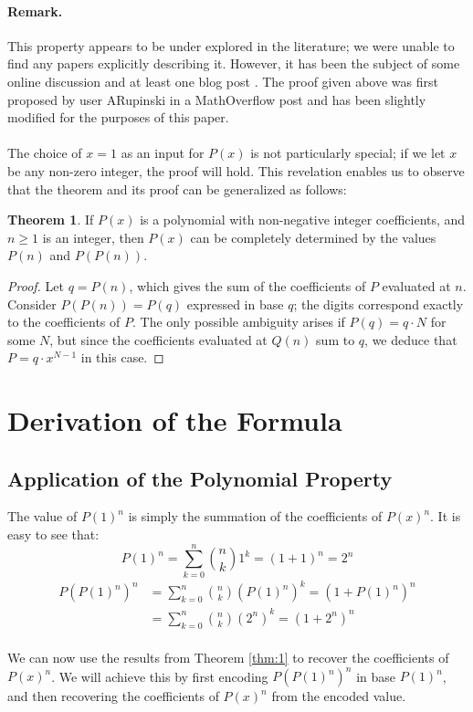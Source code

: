 \documentclass{article}
\theoremstyle{plain}
\theoremstyle{definition}
\newtheorem{thm}{Theorem}
\begin{document}
\paragraph{\textbf{Remark.}}
This property appears to be under explored in the literature; we were unable to find any papers explicitly describing it. However, it has been the subject of some online discussion and at least one blog post \cite{jcook}. The proof given above was first proposed by user ARupinski in a MathOverflow post \cite{arupinski} and has been slightly modified for the purposes of this paper.
\\
\\
The choice of $x=1$ as an input for $P(x)$ is not particularly special; if we let $x$ be any non-zero integer, the proof will hold. This revelation enables us to observe that the theorem and its proof can be generalized as follows:

\begin{thm}
\label{thm:2}
If $P(x)$ is a polynomial with non-negative integer coefficients, and $n \geq 1$ is an integer, then $P(x)$ can be completely determined by the values $P(n)$ and $P(P(n))$.
\end{thm}
\begin{proof}
Let $q = P(n)$, which gives the sum of the coefficients of $P$ evaluated at $n$. Consider $P(P(n)) = P(q)$ expressed in base $q$; the digits correspond exactly to the coefficients of $P$. The only possible ambiguity arises if $P(q) = q\cdot N$ for some $N$, but since the coefficients evaluated at $Q(n)$ sum to $q$, we deduce that $P = q \cdot x^{N-1}$ in this case.
\end{proof}

\section{Derivation of the Formula}

\subsection{Application of the Polynomial Property}
The value of $P(1)^{n}$ is simply the summation of the coefficients of $P(x)^{n}$. It is easy to see that:
\begin{equation}
P(1)^{n} = \sum_{k=0}^{n} \binom{n}{k} 1^{k} = (1 + 1)^{n} = 2^{n}
\end{equation}
\begin{align}
P(P(1)^{n})^{n} &= \sum_{k=0}^{n} \binom{n}{k} (P(1)^{n})^{k} = (1 + P(1)^{n})^{n} \\
&= \sum_{k=0}^{n} \binom{n}{k} (2^{n})^{k} = (1 + 2^{n})^{n}
\end{align}
\\
We can now use the results from Theorem \ref{thm:1} to recover the coefficients of $P(x)^{n}$. We will achieve this by first encoding $P(P(1)^{n})^{n}$ in base $P(1)^{n}$, and then recovering the coefficients of $P(x)^n$ from the encoded value.
\end{document}
